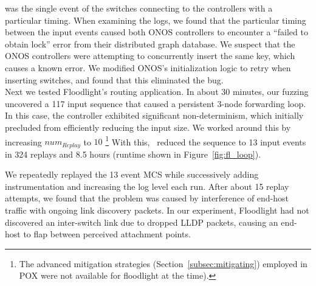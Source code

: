 was the single event of the switches connecting to the controllers with a
particular timing. When examining the logs, we found that the particular timing
between the input events caused both ONOS controllers to encounter a ``failed
to obtain lock'' error from their distributed graph database. We suspect
that the ONOS controllers were attempting to concurrently insert the same key,
which causes a known error. We modified ONOS's
initialization logic to retry when inserting switches, and found that this
eliminated the bug.\\[0.5ex]
 Next we
tested Floodlight's routing application. In about 30 minutes, our fuzzing
uncovered a 117 input sequence that caused a persistent 3-node forwarding loop.
In this case, the controller exhibited significant non-determinism, which initially
precluded \projectname{} from efficiently reducing the input size.
We worked around this by increasing $num_{Replay}$ to $10$
\footnote{The advanced mitigation strategies
(Section~\ref{subsec:mitigating}) employed in POX were not available for
floodlight at the time).} With this, \projectname~reduced the sequence to 13
input events in 324 replays and 8.5 hours (runtime shown in
Figure~\ref{fig:fl_loop}).


We repeatedly replayed the 13 event MCS while successively adding
instrumentation and increasing the log level each run. After about 15 replay
attempts, we found that the problem was caused by interference of end-host
traffic with ongoing link discovery packets. In our experiment, Floodlight had
not discovered an inter-switch link due to dropped LLDP packets, causing an
end-host to flap between perceived attachment points.


